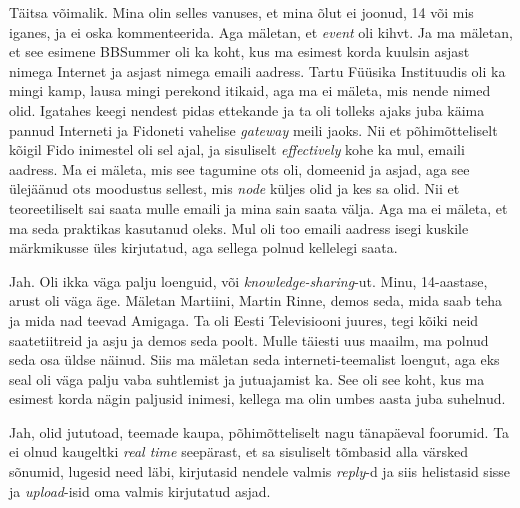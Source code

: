 Täitsa võimalik. Mina olin selles vanuses, et  mina õlut ei  joonud, 14 või mis 
iganes, ja ei oska kommenteerida. Aga mäletan, et \emph{event} oli kihvt. Ja ma 
mäletan, et see esimene BBSummer oli ka koht, kus ma esimest korda kuulsin 
asjast nimega Internet ja asjast nimega emaili aadress. Tartu Füüsika 
Instituudis oli ka mingi kamp, lausa 
mingi perekond itikaid, aga ma ei mäleta, mis nende nimed olid. Igatahes keegi 
nendest pidas ettekande ja ta oli tolleks ajaks juba käima pannud Interneti ja 
Fidoneti vahelise \emph{gateway} meili jaoks. Nii et põhimõtteliselt kõigil 
Fido inimestel oli sel ajal, ja sisuliselt \emph{effectively} kohe ka mul,   
emaili aadress. Ma ei mäleta, mis see tagumine ots oli, domeenid ja asjad, aga 
see ülejäänud ots moodustus sellest, mis \emph{node} küljes olid ja kes sa 
olid. Nii et teoreetiliselt sai saata mulle emaili ja mina sain saata välja. 
Aga ma ei mäleta, et ma seda praktikas kasutanud oleks. Mul oli 
too emaili aadress isegi kuskile märkmikusse üles kirjutatud, aga sellega 
polnud kellelegi saata. 


Jah. Oli ikka väga palju loenguid, või \emph{knowledge-sharing}-ut. Minu, 
14-aastase, arust oli väga äge. Mäletan Martiini, Martin Rinne, demos seda, mida saab teha ja 
mida nad teevad Amigaga. Ta oli Eesti Televisiooni 
juures, tegi kõiki neid 
saatetiitreid ja asju ja demos seda poolt. Mulle täiesti uus maailm, ma polnud 
seda osa üldse näinud. Siis ma mäletan seda interneti-teemalist loengut, aga 
eks seal oli väga palju vaba suhtlemist ja jutuajamist ka. See oli see koht, 
kus ma esimest korda nägin paljusid inimesi, kellega ma olin umbes aasta juba 
suhelnud. 


Jah, olid jututoad, teemade kaupa, põhimõtteliselt nagu tänapäeval foorumid. 
Ta ei olnud kaugeltki \emph{real time} seepärast, et sa sisuliselt tõmbasid 
alla värsked sõnumid, lugesid need läbi, kirjutasid nendele valmis 
\emph{reply}-d ja siis  helistasid sisse ja \emph{upload}-isid oma valmis 
kirjutatud asjad. 

